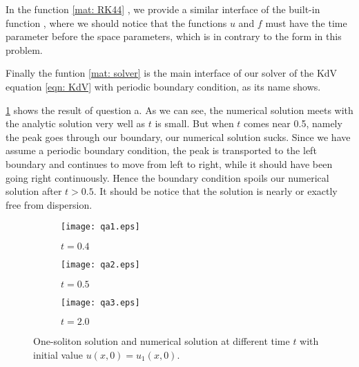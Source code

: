 \documentclass{assignment}[2019/10/15]
\begin{document}

    In the function \ref{mat: RK44} , we provide a similar interface of the built-in function , where we should notice that the functions $u$ and $f$ must have the time parameter before the space parameters, which is in contrary to the form in this problem.


    Finally the funtion \ref{mat: solver}  is the main interface of our solver of the KdV equation \ref{eqn: KdV} with periodic boundary condition, as its name shows.


    \ref{fig: qa} shows the result of question a. As we can see, the numerical solution meets with the analytic solution very well as $t$ is small. But when $t$ comes near 0.5, namely the peak goes through our boundary, our numerical solution sucks. Since we have assume a periodic boundary condition, the peak is transported to the left boundary and continues to move from left to right, while it should have been going right continuously. Hence the boundary condition spoils our numerical solution after $t>0.5$. It should be notice that the solution is nearly or exactly free from dispersion.

    \begin{figure}[htb]
        \begin{subfigure}[b]{0.32\textwidth}
            \centering
            \texttt{[image: qa1.eps]}
            \caption{$t=0.4$}
        \end{subfigure}
        \hfill
        \begin{subfigure}[b]{0.32\textwidth}
            \centering
            \texttt{[image: qa2.eps]}
            \caption{$t=0.5$}
        \end{subfigure}
        \hfill
        \begin{subfigure}[b]{0.32\textwidth}
            \centering
            \texttt{[image: qa3.eps]}
            \caption{$t=2.0$}
        \end{subfigure}
        \caption{One-soliton solution and numerical solution at different time $t$ with initial value $u(x, 0) = u_1(x, 0)$.}
        \label{fig: qa}
    \end{figure}
\end{document}

